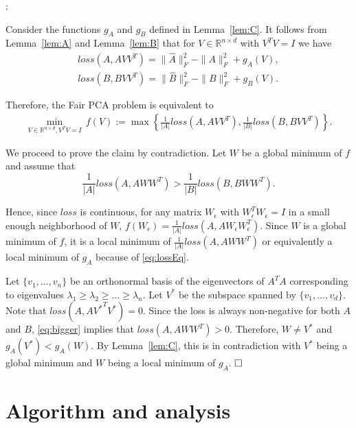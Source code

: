 \documentclass{article}
\newenvironment{proofof}[1]{\smallskip\noindent{\bf Proof of #1}:}{$\hfill \Box$\\}
\begin{document}
\begin{proofof}{Theorem~\ref{thm:sameLoss}}

  Consider the functions $g_A$ and $g_B$ defined in Lemma~\ref{lem:C}.
  It follows from Lemma~\ref{lem:A} and Lemma~\ref{lem:B} that for
  $V\in \mathbb{R}^{n\times d}$ with  $V^TV=I$ we have
        \begin{align}
        \label{eq:lossEq}
        loss(A, AVV^T) = \|\widehat{A}\|_F^2 - \|A\|_F^2 + g_A(V), \\
        loss(B, BVV^T) = \|\widehat{B}\|_F^2 - \|B\|_F^2 + g_B(V).  \nonumber       
        \end{align}

Therefore, the Fair PCA problem is equivalent to
\begin{align*}
  \min_{V \in \mathbb{R}^{n\times d}, V^TV=I} \, f(V):=\max \left\{ \frac{1}{|A|} loss(A, AVV^T)
  , \frac{1}{|B|} loss(B, BVV^T) \right\}.
\end{align*}

We proceed to prove the claim by contradiction.
Let $W$ be a global minimum of $f$ and assume that
\begin{equation}
\label{eq:bigger}
\frac{1}{|A|}loss(A, AWW^T) > \frac{1}{|B|}loss(B, BWW^T).
\end{equation}

Hence, since $loss$ is continuous, for any matrix $W_\epsilon$ with $W_\epsilon ^T W_\epsilon =I$ in a small enough neighborhood  of $W$, $f(W_\epsilon)= \frac{1}{|A|}loss(A, AW_\epsilon W_\epsilon ^T)$. Since $W$ is a global minimum of $f$, it is a local minimum of $\frac{1}{|A|} loss(A, AWW^T)$ or equivalently a local minimum of 
$g_A$ because of \eqref{eq:lossEq}.

Let $\{v_1, \ldots, v_n\}$ be an orthonormal basis of the eigenvectors
of $A^TA$ corresponding to eigenvalues
$\lambda_1 \geq \lambda_2 \geq \ldots \geq \lambda_n$. Let $V^*$ be
the subspace spanned by $\{v_1,\ldots,v_d\}$. Note that
$loss(A, A{V^*}^TV^*)=0$. Since the loss is always non-negative for
both $A$ and $B$, \eqref{eq:bigger} implies that $loss(A, AWW^T) > 0$.
Therefore, $W\neq V^*$ and $g_A(V^*) < g_A(W)$. By Lemma~\ref{lem:C}, this is in contradiction with $V^*$ being a global minimum and $W$ being a local minimum of $g_A$.
\end{proofof}

\section{Algorithm and analysis}
\end{document}
